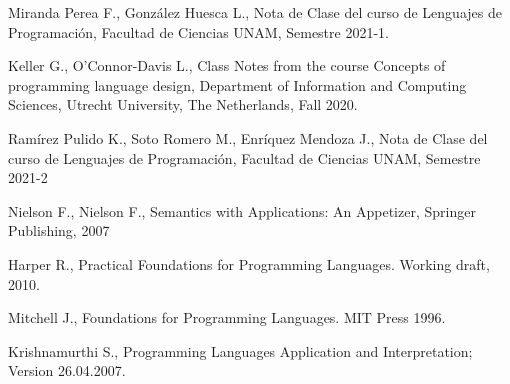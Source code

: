 \documentclass[12pt]{extarticle}
\begin{document}
\begin{thebibliography}{9}

Miranda Perea F., González Huesca L., Nota de Clase del curso de Lenguajes de Programación, Facultad de Ciencias UNAM, Semestre 2021-1.

Keller G., O'Connor-Davis L., Class Notes from the course Concepts of programming language design, Department of Information and Computing Sciences, Utrecht University, The Netherlands, Fall 2020.

Ramírez Pulido K., Soto Romero M., Enríquez Mendoza J., Nota de Clase del curso de Lenguajes de Programación, Facultad de Ciencias UNAM, Semestre 2021-2

\label{swann}
Nielson F., Nielson F., Semantics with Applications: An Appetizer, Springer Publishing, 2007

Harper R., Practical Foundations for Programming Languages. Working draft, 2010.

Mitchell J., Foundations for Programming Languages. MIT Press 1996.

Krishnamurthi S., Programming Languages Application and Interpretation; Version 26.04.2007.


\end{thebibliography}
\end{document}
